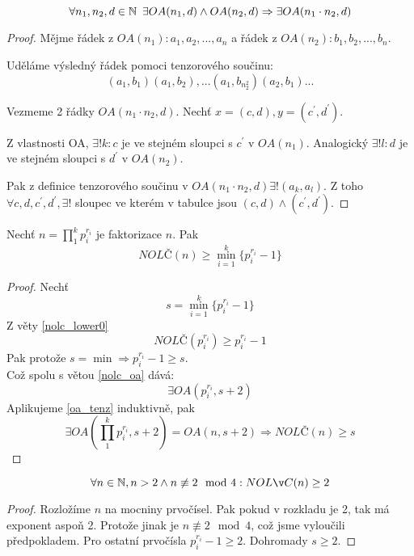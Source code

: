 \begin{theorem}\label{oa_tenz}
	\[ \forall n_1,n_2,d \in \operatorname{\mathbb{N}} \ \exists OA(n_1, d) \land OA(n_2, d) \Rightarrow \exists OA(n_1 \cdot n_2, d) \]
\end{theorem}
\begin{proof}
	Mějme řádek z $OA(n_1): a_1, a_2, ..., a_n$ a řádek z $OA(n_2): b_1, b_2, ..., b_n$.

	Uděláme výsledný řádek pomoci tenzorového součinu:
	\[ (a_1, b_1) (a_1, b_2), ...(a_1, b_{n_2^2})(a_2, b_1) ... \]

	Vezmeme 2 řádky $OA(n_1 \cdot n_2, d)$.
	Nechť $x = (c, d), y = (c^{\prime}, d^{\prime})$.

	Z vlastnosti OA, $\exists! k: c$ je ve stejném sloupci s $c^{\prime}$ v $OA(n_1)$.
	Analogický $\exists! l: d$ je ve stejném sloupci s $d^{\prime}$ v $OA(n_2)$.

	Pak z definice tenzorového součinu v $OA(n_1 \cdot n_2, d) \exists ! (a_k, a_l)$.
	Z toho
	$ \forall c, d, c^{\prime}, d^{\prime}, \exists !$ sloupec ve kterém v tabulce jsou $(c, d) \land (c^{\prime}, d^{\prime})$.
\end{proof}

\begin{theorem}
	Nechť $n = \prod_1^k p_i^{r_i}$ je faktorizace $n$. Pak
	\[ NOLČ(n) \geq \min_{i = 1}^k \{ p_i^{r_i} - 1 \}  \]
\end{theorem}
\begin{proof}
	Nechť \[ s = \min_{i = 1}^k \{ p_i^{r_i} - 1 \} \]
	Z věty \cref{nolc_lower0}
	\[ NOLČ(p_i^{r_i}) \geq p_i^{r_i} - 1 \]
	Pak protože $s = \min \Rightarrow p_i^{r_i} - 1 \geq s$.\\
	Což spolu s větou \cref{nolc_oa} dává:
	\[ \exists OA(p_i^{r_i}, s + 2) \]
	Aplikujeme \cref{oa_tenz} induktivně, pak
	\[ \exists OA(\prod_1^k p_i^{r_i}, s + 2) = OA(n, s + 2) \Rightarrow NOLČ(n) \geq s \]
\end{proof}

\begin{consequence}\label{nolc_lower_1}
	\[ \forall n \in \N, n > 2 \land n \not\equiv 2 \mod 4: NOLČ(n) \geq 2 \]
\end{consequence}
\begin{proof}
	Rozložíme $n$ na mocniny prvočísel. Pak pokud v rozkladu je 2, tak má exponent aspoň 2.
	Protože jinak je $n \not\equiv 2 \mod 4$, což jsme vyloučili předpokladem.
	Pro ostatní prvočísla $p_i^{r_i} - 1 \geq 2$.
	Dohromady $s \geq 2$.
\end{proof}

